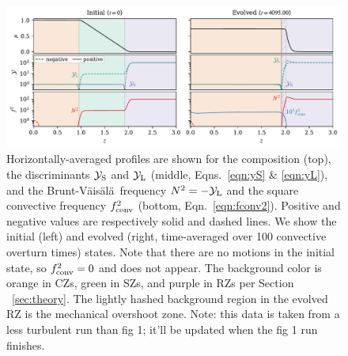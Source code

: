 \documentclass[twocolumn, linenumbers, twocolappendix]{aastex631}
\newcommand{\yL}{\ensuremath{\mathcal{Y}_{\rm{L}}}}
\newcommand{\yS}{\ensuremath{\mathcal{Y}_{\rm{S}}}}
\newcommand{\brunt}{{Brunt-V\"{a}is\"{a}l\"{a}}}
\begin{document}
\begin{figure}[t]
\centering
\includegraphics[width=\textwidth]{fig2_profiles.pdf}
\caption{
    Horizontally-averaged profiles are shown for the composition (top), the discriminants $\yS$ and $\yL$ (middle, Eqns.~\ref{eqn:yS} \& \ref{eqn:yL}), and the \brunt$\,$ frequency $N^2 = -\yL$ and the square convective frequency $f_{\rm{conv}}^2$ (bottom, Eqn.~\ref{eqn:fconv2}).
    Positive and negative values are respectively solid and dashed lines.
    We show the initial (left) and evolved (right, time-averaged over 100 convective overturn times) states.
    Note that there are no motions in the initial state, so $f_{\rm{conv}}^2 = 0$ and does not appear.
    The background color is orange in CZs, green in SZs, and purple in RZs per Section ~\ref{sec:theory}.
    The lightly hashed background region in the evolved RZ is the mechanical overshoot zone.
    {\color{blue} Note: this data is taken from a less turbulent run than fig 1; it'll be updated when the fig 1 run finishes.}
\label{fig:profiles}
}
\end{figure}




\end{document}
